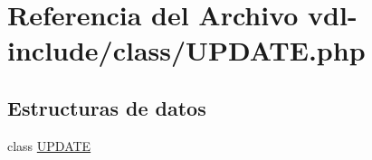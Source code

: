 \hypertarget{vdl-include_2class_2update_8php}{\section{Referencia del Archivo vdl-\/include/class/\-U\-P\-D\-A\-T\-E.php}
\label{vdl-include_2class_2update_8php}
}
\subsection*{Estructuras de datos}
\begin{DoxyCompactItemize}
\item 
class \hyperlink{classUPDATE}{U\-P\-D\-A\-T\-E}
\end{DoxyCompactItemize}

